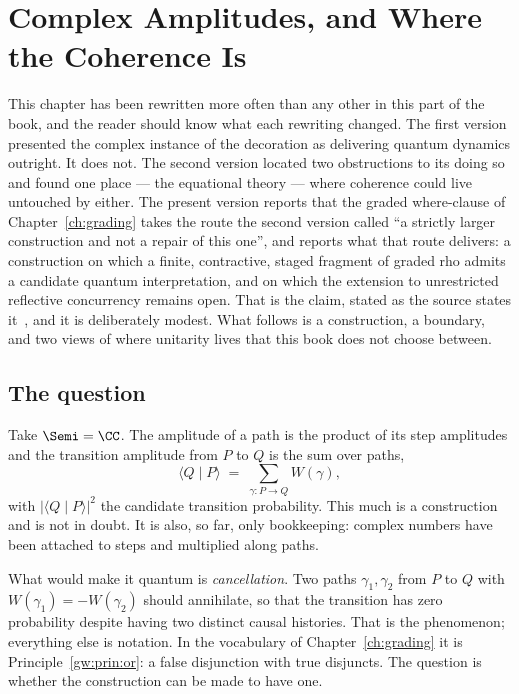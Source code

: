 \chapter{Complex Amplitudes, and Where the Coherence Is}
\label{sec:quantum}

\begin{remark}
\label{rmk:ch09status}
This chapter has been rewritten more often than any other in this part of the
book, and the reader should know what each rewriting changed.  The first
version presented the complex instance of the decoration as delivering
quantum dynamics outright.  It does not.  The second version located two
obstructions to its doing so and found one place --- the equational theory
--- where coherence could live untouched by either.  The present version
reports that the graded where-clause of Chapter~\ref{ch:grading} takes the
route the second version called ``a strictly larger construction and not a
repair of this one'', and reports what that route delivers: a construction on
which a finite, contractive, staged fragment of graded rho admits a candidate
quantum interpretation, and on which the extension to unrestricted reflective
concurrency remains open.  That is the claim, stated as the source states
it~\cite{GradedQuantum}, and it is deliberately modest.  What follows is a
construction, a boundary, and two views of where unitarity lives that this
book does not choose between.
\end{remark}

\section{The question}

Take $\Semi = \CC$.  The amplitude of a path is the product of its step
amplitudes and the transition amplitude from $P$ to $Q$ is the sum over
paths,
\[
  \langle Q \mid P \rangle \;=\; \sum_{\gamma : P \to Q} W(\gamma),
\]
with $|\langle Q \mid P\rangle|^2$ the candidate transition probability.
This much is a construction and is not in doubt.  It is also, so far, only
bookkeeping: complex numbers have been attached to steps and multiplied
along paths.

What would make it quantum is \emph{cancellation}.  Two paths $\gamma_1,
\gamma_2$ from $P$ to $Q$ with $W(\gamma_1) = -W(\gamma_2)$ should
annihilate, so that the transition has zero probability despite having two
distinct causal histories.  That is the phenomenon; everything else is
notation.  In the vocabulary of Chapter~\ref{ch:grading} it is
Principle~\ref{gw:prin:or}: a false disjunction with true disjuncts.  The
question is whether the construction can be made to have one.

